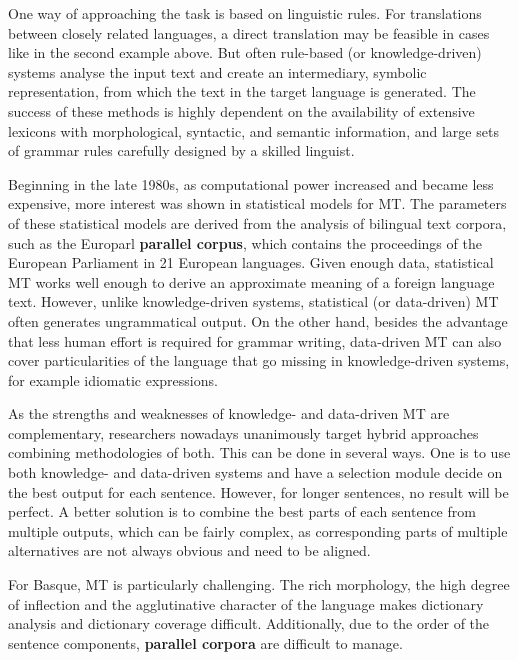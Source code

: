 \begin{multicols}{2}
One way of approaching the task is based on linguistic rules. For translations between closely related languages, a direct translation may be feasible in cases like in the second example above. But often rule-based (or knowledge-driven) systems analyse the input text and create an intermediary, symbolic representation, from which the text in the target language is generated. The success of these methods is highly dependent on the availability of extensive lexicons with morphological, syntactic, and semantic information, and large sets of grammar rules carefully designed by a skilled linguist.

Beginning in the late 1980s, as computational power increased and became less expensive, more interest was shown in statistical models for MT. The parameters of these statistical models are derived from the analysis of bilingual text 
corpora, such as the Europarl 
\textbf{parallel corpus}, which contains the proceedings of the European Parliament in 21 European languages. Given enough data, statistical MT works well enough to derive an approximate meaning of a foreign language text. However, unlike knowledge-driven systems, statistical (or data-driven) MT often generates ungrammatical output. On the other hand, besides the advantage that less human effort is required for grammar writing, data-driven MT can also cover particularities of the language that go missing in knowledge-driven systems, for example idiomatic expressions. 

As the strengths and weaknesses of knowledge- and data-driven MT are complementary, researchers nowadays unanimously target hybrid approaches combining methodologies of both. This can be done in several ways. One is to use both knowledge- and data-driven systems and have a selection module decide on the best output for each sentence. However, for longer sentences, no result will be perfect. A better solution is to combine the best parts of each sentence from multiple outputs, which can be fairly complex, as corresponding parts of multiple alternatives are not always obvious and need to be aligned. 

For Basque, MT is particularly challenging. The rich morphology, the high degree of inflection and the agglutinative character of the language makes dictionary analysis and dictionary coverage difficult. Additionally, due to the order of the sentence components, \textbf{parallel corpora} are difficult to manage. 


\end{multicols}
